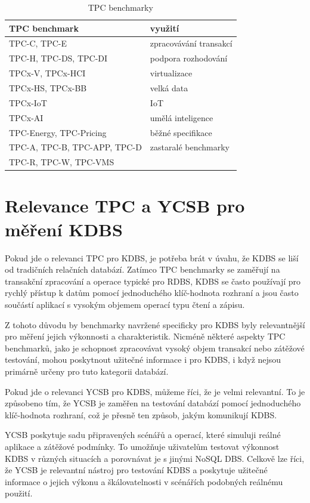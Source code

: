 \documentclass[czech,master,dept460,male,csharp,cpdeclaration]{diploma}
\begin{document}
	\begin{table}
		\centering
		\begin{tabular}{ l | l }
			\toprule
			TPC benchmark & využití\\
			\midrule
			TPC-C, TPC-E & zpracovávání transakcí \\
			TPC-H, TPC-DS, TPC-DI & podpora rozhodování \\
			TPCx-V, TPCx-HCI & virtualizace \\
			TPCx-HS, TPCx-BB & velká data \\
			TPCx-IoT & IoT \\
			TPCx-AI & umělá inteligence \\
			TPC-Energy, TPC-Pricing & běžné specifikace \\
			TPC-A, TPC-B, TPC-APP, TPC-D & zastaralé benchmarky \\
			TPC-R, TPC-W, TPC-VMS & \\
			\bottomrule
		\end{tabular}
		\caption{TPC benchmarky\label{tab_tpc_modely}}
	\end{table}
	
	\section{Relevance TPC a YCSB pro měření KDBS}
	
	Pokud jde o relevanci TPC pro KDBS, je potřeba brát v úvahu, že KDBS se liší od tradičních relačních databází. Zatímco TPC benchmarky se zaměřují na transakční zpracování a operace typické pro RDBS, KDBS se často používají pro rychlý přístup k datům pomocí jednoduchého klíč-hodnota rozhraní a jsou často součástí aplikací s vysokým objemem operací typu čtení a zápisu.
	
	Z tohoto důvodu by benchmarky navržené specificky pro KDBS byly relevantnější pro měření jejich výkonnosti a charakteristik. Nicméně některé aspekty TPC benchmarků, jako je schopnost zpracovávat vysoký objem transakcí nebo zátěžové testování, mohou poskytnout užitečné informace i pro KDBS, i když nejsou primárně určeny pro tuto kategorii databází.
	
	Pokud jde o relevanci YCSB pro KDBS, můžeme říci, že je velmi relevantní. To je způsobeno tím, že YCSB je zaměřen na testování databází pomocí jednoduchého klíč-hodnota rozhraní, což je přesně ten způsob, jakým komunikují KDBS.
	
	YCSB poskytuje sadu připravených scénářů a operací, které simuluji reálné aplikace a zátěžové podmínky. To umožňuje uživatelům testovat výkonnost KDBS v různých situacích a porovnávat je s jinými NoSQL DBS. Celkově lze říci, že YCSB je relevantní nástroj pro testování KDBS a poskytuje užitečné informace o jejich výkonu a škálovatelnosti v scénářích podobných reálnému použití.
	
\end{document}

